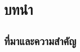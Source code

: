 \documentclass[12pt,oneside,openright,a4paper]{cpe-thai-project}
\begin{document}





\chapter{บทนำ}

\section{ที่มาและความสำคัญ}
\end{document}
